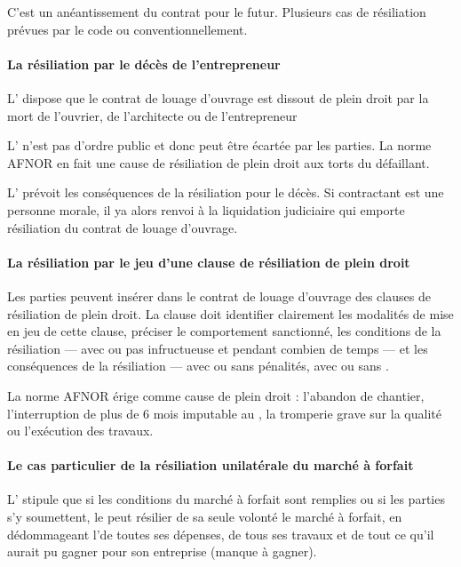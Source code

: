 				C’est un anéantissement du contrat pour le futur. Plusieurs cas de résiliation prévues par le code ou conventionnellement.

				\paragraph{La résiliation par le décès de l'entrepreneur}

					L' dispose que le contrat de louage d’ouvrage est dissout de plein droit par la mort de l’ouvrier, de l’architecte ou de l’entrepreneur



					L' n’est pas d’ordre public et donc peut être écartée par les parties.
La norme AFNOR en fait une cause de résiliation de plein droit aux torts du défaillant.


					L' prévoit les conséquences de la résiliation pour le décès.
Si contractant est une personne morale, il ya alors renvoi à la liquidation judiciaire qui emporte résiliation du contrat de louage d’ouvrage.



				\paragraph{La résiliation par le jeu d'une clause de résiliation de plein droit}

					Les parties peuvent insérer dans le contrat de louage d’ouvrage des clauses de résiliation de plein droit. La clause doit identifier clairement les modalités de mise en jeu de cette clause, préciser le comportement sanctionné, les conditions de la résiliation --- avec ou pas \med infructueuse et pendant combien de temps --- et les conséquences de la résiliation --- avec ou sans pénalités, avec ou sans \di.


					La norme AFNOR érige comme cause de plein droit : l’abandon de chantier, l'interruption de plus de 6 mois imputable au \Mo, la tromperie grave sur la qualité ou l’exécution des travaux.



				\paragraph{Le cas particulier de la résiliation unilatérale du marché à forfait}

					L' stipule que si les conditions du marché à forfait sont remplies ou si les parties s’y soumettent, le \Mo peut résilier de sa seule volonté le marché à forfait, en dédommageant l’\E de toutes ses dépenses, de tous ses travaux et de tout ce qu’il aurait pu gagner pour son entreprise (manque à gagner).


